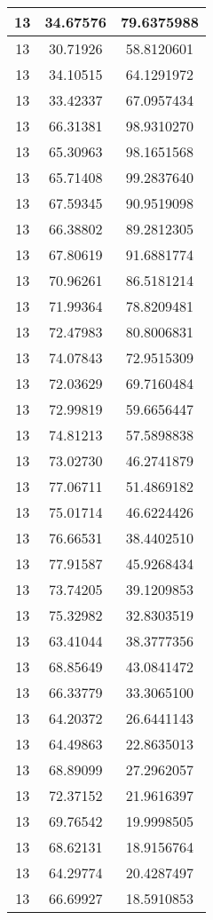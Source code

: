 \documentclass[
]{book}
\begin{document}
\begin{tabular}{c|c|c}
\hline
13 & 34.67576 & 79.6375988\\
\hline
13 & 30.71926 & 58.8120601\\
\hline
13 & 34.10515 & 64.1291972\\
\hline
13 & 33.42337 & 67.0957434\\
\hline
13 & 66.31381 & 98.9310270\\
\hline
13 & 65.30963 & 98.1651568\\
\hline
13 & 65.71408 & 99.2837640\\
\hline
13 & 67.59345 & 90.9519098\\
\hline
13 & 66.38802 & 89.2812305\\
\hline
13 & 67.80619 & 91.6881774\\
\hline
13 & 70.96261 & 86.5181214\\
\hline
13 & 71.99364 & 78.8209481\\
\hline
13 & 72.47983 & 80.8006831\\
\hline
13 & 74.07843 & 72.9515309\\
\hline
13 & 72.03629 & 69.7160484\\
\hline
13 & 72.99819 & 59.6656447\\
\hline
13 & 74.81213 & 57.5898838\\
\hline
13 & 73.02730 & 46.2741879\\
\hline
13 & 77.06711 & 51.4869182\\
\hline
13 & 75.01714 & 46.6224426\\
\hline
13 & 76.66531 & 38.4402510\\
\hline
13 & 77.91587 & 45.9268434\\
\hline
13 & 73.74205 & 39.1209853\\
\hline
13 & 75.32982 & 32.8303519\\
\hline
13 & 63.41044 & 38.3777356\\
\hline
13 & 68.85649 & 43.0841472\\
\hline
13 & 66.33779 & 33.3065100\\
\hline
13 & 64.20372 & 26.6441143\\
\hline
13 & 64.49863 & 22.8635013\\
\hline
13 & 68.89099 & 27.2962057\\
\hline
13 & 72.37152 & 21.9616397\\
\hline
13 & 69.76542 & 19.9998505\\
\hline
13 & 68.62131 & 18.9156764\\
\hline
13 & 64.29774 & 20.4287497\\
\hline
13 & 66.69927 & 18.5910853\\

\end{tabular}
\end{document}
